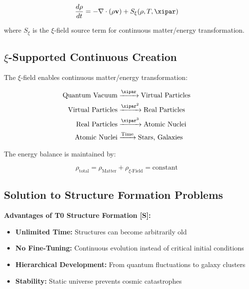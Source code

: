 	\begin{equation}
		\frac{d\rho}{dt} = -\nabla \cdot (\rho \mathbf{v}) + S_\xi(\rho, T, \xipar)
	\end{equation}
	
	where $S_\xi$ is the $\xi$-field source term for continuous matter/energy transformation.
	
	\subsection{$\xi$-Supported Continuous Creation}
	
	The $\xi$-field enables continuous matter/energy transformation:
	
	\begin{align}
		\text{Quantum Vacuum} &\xrightarrow{\xipar} \text{Virtual Particles} \\
		\text{Virtual Particles} &\xrightarrow{\xipar^2} \text{Real Particles} \\
		\text{Real Particles} &\xrightarrow{\xipar^3} \text{Atomic Nuclei} \\
		\text{Atomic Nuclei} &\xrightarrow{\text{Time}} \text{Stars, Galaxies}
	\end{align}
	
	The energy balance is maintained by:
	
	\begin{equation}
		\rho_{\text{total}} = \rho_{\text{Matter}} + \rho_{\xi\text{-Field}} = \text{constant}
	\end{equation}
	
	\subsection{Solution to Structure Formation Problems}
	
	\begin{keyresult}
		\textbf{Advantages of T0 Structure Formation [S]:}
		
		\begin{itemize}
			\item \textbf{Unlimited Time:} Structures can become arbitrarily old
			\item \textbf{No Fine-Tuning:} Continuous evolution instead of critical initial conditions
			\item \textbf{Hierarchical Development:} From quantum fluctuations to galaxy clusters
			\item \textbf{Stability:} Static universe prevents cosmic catastrophes
		\end{itemize}
	\end{keyresult}
	
